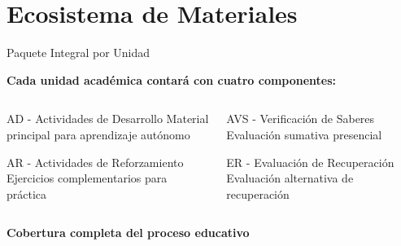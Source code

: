 \documentclass[10pt,aspectratio=169]{beamer}
\begin{document}
	
	\section{Ecosistema de Materiales}
	
	\begin{frame}{Paquete Integral por Unidad}
		\begin{center}
			\textbf{Cada unidad académica contará con cuatro componentes:}
		\end{center}
		
		\vspace{0.5cm}
		
		\begin{columns}
			\begin{column}{0.5\textwidth}
				\begin{block}{AD - Actividades de Desarrollo}
					Material principal para aprendizaje autónomo
				\end{block}
				
				\begin{block}{AR - Actividades de Reforzamiento}
					Ejercicios complementarios para práctica
				\end{block}
			\end{column}
			
			\begin{column}{0.5\textwidth}
				\begin{block}{AVS - Verificación de Saberes}
					Evaluación sumativa presencial
				\end{block}
				
				\begin{block}{ER - Evaluación de Recuperación}
					Evaluación alternativa de recuperación
				\end{block}
			\end{column}
		\end{columns}
		
		\vspace{0.5cm}
		
		\begin{center}
			\textcolor{verdeExito}{\textbf{Cobertura completa del proceso educativo}}
		\end{center}
	\end{frame}
	
	
\end{document}
